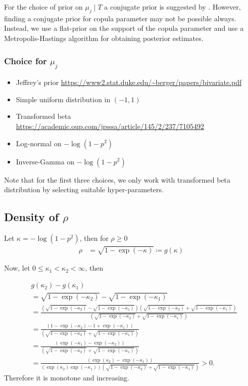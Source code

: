 \documentclass{amsart}
\begin{document}
For the choice of prior on $\mu_j\mid T$ a conjugate prior is suggested by \citet{chipman_BART,serafini2024lossbasedpriortreetopologies}. However, finding a conjugate prior for copula parameter may not be possible always. Instead, we use a flat-prior on the support of the copula parameter and use a Metropolis-Hastings algorithm for obtaining posterior estimates.


\iffalse

\subsubsection{Choice for $\mu_j$}
\begin{itemize}
    \item Jeffrey's prior \url{https://www2.stat.duke.edu/~berger/papers/bivariate.pdf}
    \item Simple uniform distribution in $(-1,1)$ 
    \item Transformed beta \url{https://academic.oup.com/jrsssa/article/145/2/237/7105492}
    \item Log-normal on $-\log(1-p^2)$
    \item Inverse-Gamma on $-\log(1-p^2)$
\end{itemize}
Note that for the first three choices, we only work with transformed beta distribution by 
selecting suitable hyper-parameters.

\subsection{Density of $\rho$}

Let $\kappa = -\log(1-p^2)$, then for $\rho \ge 0$
\begin{align}
	\rho & = \sqrt{1-\exp(-\kappa)}\coloneqq g(\kappa)
\end{align}

Now, let $0\le\kappa_1 < \kappa_2<\infty$, then

\begin{align}
	&g(\kappa_2) - g(\kappa_1)\\
	&=\sqrt{1-\exp(-\kappa_2)} - \sqrt{1-\exp(-\kappa_1)}\\
	&= \frac{(\sqrt{1-\exp(-\kappa_2)} - \sqrt{1-\exp(-\kappa_1)})(\sqrt{1-\exp(-\kappa_2)} + \sqrt{1-\exp(-\kappa_1)})}{(\sqrt{1-\exp(-\kappa_2)} + \sqrt{1-\exp(-\kappa_1)})}\\
	&= \frac{(1-\exp(-\kappa_2) - 1+\exp(-\kappa_1))}{(\sqrt{1-\exp(-\kappa_2)} + \sqrt{1-\exp(-\kappa_1)})}\\
	&= \frac{(\exp(-\kappa_1)-\exp(-\kappa_2))}{(\sqrt{1-\exp(-\kappa_2)} + \sqrt{1-\exp(-\kappa_1)})}\\
	&= \frac{(\exp(\kappa_2)-\exp(-\kappa_1))}
	{(\exp(\kappa_2)\exp(-\kappa_1))(\sqrt{1-\exp(-\kappa_2)} + \sqrt{1-\exp(-\kappa_1)})} >0.
\end{align}
Therefore it is monotone and increasing.
\end{document}
